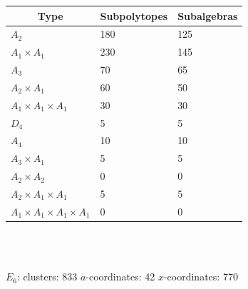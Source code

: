 \documentclass[11pt]{article}
\begin{document}
\begin{tabular}{ | l | l | l |}
\multicolumn{1}{c}{Type} &  \multicolumn{1}{c}{Subpolytopes}  &  \multicolumn{1}{c}{Subalgebras} \\
\hline \(A_2\) & 180 & 125 \\ 
\hline \(A_1 \times A_1\) & 230 & 145 \\ \hline 
\hline \(A_3\) & 70 & 65 \\ 
\hline \(A_2 \times A_1\) & 60 & 50 \\ 
\hline \(A_1 \times A_1 \times A_1\) & 30 & 30 \\ \hline 
\hline \(D_4\) & 5 & 5 \\ 
\hline \(A_4\) & 10 & 10 \\ 
\hline \(A_3 \times A_1\) & 5 & 5 \\ 
\hline \(A_2 \times A_2\) & 0 & 0 \\ 
\hline \(A_2 \times A_1 \times A_1\) & 5 & 5 \\ 
\hline \(A_1 \times A_1 \times A_1 \times A_1\) & 0 & 0 \\ 
\hline
\end{tabular} \\ \\ 

\pagebreak

{\Large\underline{\(E_6\)}:} \quad clusters: 833 \qquad \(a\)-coordinates: 42 \qquad \(x\)-coordinates: 770\\
\end{document}
